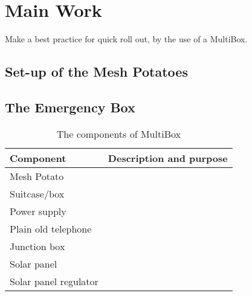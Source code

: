 \chapter{Main Work}
\label{chp:quickrollout} 

Make a best practice for quick roll out, by the use of a MultiBox. 

\section{Set-up of the Mesh Potatoes}

\section{The Emergency Box}

\begin{center}
\begin{table}[!ht]
\caption{\label{tab:components}The components of MultiBox}
    \begin{tabular}{ | l | p{9cm} |}
    \hline
    \textbf{Component} & \textbf{Description and purpose} \\ 
    \hline
    Mesh Potato &  \\ 
    \hline
    Suitcase/box &   \\ 
    \hline
    Power supply & \\
    \hline
    Plain old telephone & \\
	\hline
	Junction box & \\
	\hline
	Solar panel & \\
	\hline
	Solar panel regulator & \\
	\hline
    \end{tabular}
   \end{table}
\end{center}


